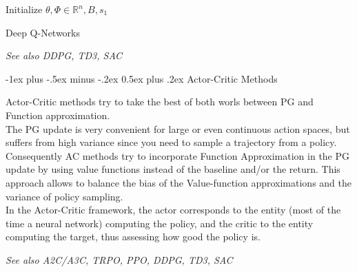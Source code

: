 \documentclass[10pt,landscape]{article}
\makeatletter
\renewcommand{\section}{\@startsection{section}{1}{0mm}%
                                {-1ex plus -.5ex minus -.2ex}%
                                {0.5ex plus .2ex}%
                                {\normalfont\large\bfseries}}
\makeatother
\begin{document}
\begin{multicols}{3}
\begin{algorithm}[H]
 Initialize $\theta, \Phi \in \mathbb{R}^n, B, s_1$\\
\caption{Deep Q-Networks}
\end{algorithm}

\begingroup
    \fontsize{5pt}{8pt}
        \textit{See also DDPG, TD3, SAC}
\endgroup



\section{Actor-Critic Methods}

Actor-Critic methods try to take the best of both worls between PG and Function approximation. \\The PG update is very convenient for large or even continuous action spaces, but suffers from high variance since you need to sample a trajectory from a policy. Consequently AC methods try to incorporate Function Approximation in the PG update by using value functions instead of the baseline and/or the return. This approach allows to balance the bias of the Value-function approximations and the variance of policy sampling.\\
In the Actor-Critic framework, the actor corresponds to the entity (most of the time a neural network) computing the policy, and the critic to the entity computing the target, thus assessing how good the policy is.

\tiny \textit{See also A2C/A3C, TRPO, PPO, DDPG, TD3, SAC}
\end{multicols}
\end{document}
